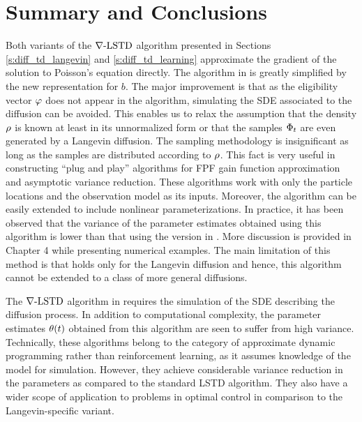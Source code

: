  \section{Summary and Conclusions}
 \label{s:ch2_conclusions}
 
Both variants of the $\nabla\text{-LSTD}$ algorithm presented in Sections \ref{s:diff_td_langevin} and \ref{s:diff_td_learning} approximate the gradient of the solution to Poisson's equation directly. 
The algorithm in  is greatly simplified by the new representation for $b$. The major improvement is that as the eligibility vector $\varphi$ does not appear in the algorithm, simulating the SDE associated to the diffusion can be avoided. This enables us to relax the assumption that the density $\rho$ is known at least in its unnormalized form or that the samples $\Phi_t$ are even generated by a Langevin diffusion. The sampling methodology is insignificant as long as the samples are distributed according to $\rho$. This fact is very useful in constructing ``plug and play'' algorithms for FPF gain function approximation and asymptotic variance reduction. These algorithms work with only the particle locations and the observation model as its inputs.  Moreover, the algorithm can be easily extended to include nonlinear parameterizations. In practice, it has been observed that the variance of the parameter estimates obtained using this algorithm is lower than that using the version in . More discussion is provided in Chapter 4 while presenting numerical examples. The main limitation of this method is that  holds only for the Langevin diffusion and hence, this algorithm cannot be extended to a class of more general diffusions.
 
The $\nabla\text{-LSTD}$ algorithm in  requires the simulation of the SDE describing the diffusion process.  In addition to computational complexity, the parameter estimates $\theta(t)$ obtained from this algorithm are seen to suffer from high variance. Technically, these algorithms belong to the category of approximate dynamic programming rather than reinforcement learning, as it assumes knowledge of the model for simulation. However, they achieve considerable variance reduction in the parameters as compared to the standard LSTD algorithm. They also have a wider scope of application to problems in optimal control in comparison to the Langevin-specific variant. 
 

